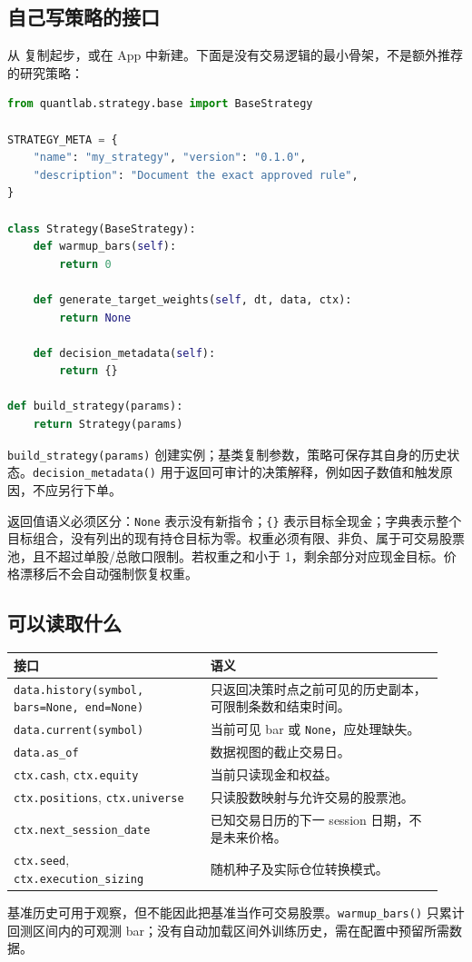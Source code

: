 \documentclass[UTF8,fontset=none,11pt]{ctexart}
\newcommand{\code}[1]{\nolinkurl{#1}}
\let\originalsubsection\subsection
\renewcommand{\subsection}{\Needspace{8\baselineskip}\originalsubsection}
\begin{document}
\subsection{自己写策略的接口}
从  复制起步，或在 App 中新建。下面是没有交易逻辑的最小骨架，不是额外推荐的研究策略：
\begin{lstlisting}[language=Python]
from quantlab.strategy.base import BaseStrategy

STRATEGY_META = {
    "name": "my_strategy", "version": "0.1.0",
    "description": "Document the exact approved rule",
}

class Strategy(BaseStrategy):
    def warmup_bars(self):
        return 0

    def generate_target_weights(self, dt, data, ctx):
        return None

    def decision_metadata(self):
        return {}

def build_strategy(params):
    return Strategy(params)
\end{lstlisting}
\code{build_strategy(params)} 创建实例；基类复制参数，策略可保存其自身的历史状态。\code{decision_metadata()} 用于返回可审计的决策解释，例如因子数值和触发原因，不应另行下单。

返回值语义必须区分：\code{None} 表示没有新指令；\texttt{\{\}} 表示目标全现金；字典表示整个目标组合，没有列出的现有持仓目标为零。权重必须有限、非负、属于可交易股票池，且不超过单股/总敞口限制。若权重之和小于 1，剩余部分对应现金目标。价格漂移后不会自动强制恢复权重。

\subsection{可以读取什么}
\begin{longtable}{p{0.43\linewidth}p{0.51\linewidth}}
\toprule 接口 & 语义\\\midrule\endhead
\code{data.history(symbol, bars=None, end=None)} & 只返回决策时点之前可见的历史副本，可限制条数和结束时间。\\
\code{data.current(symbol)} & 当前可见 bar 或 \code{None}，应处理缺失。\\
\code{data.as_of} & 数据视图的截止交易日。\\
\code{ctx.cash}, \code{ctx.equity} & 当前只读现金和权益。\\
\code{ctx.positions}, \code{ctx.universe} & 只读股数映射与允许交易的股票池。\\
\code{ctx.next_session_date} & 已知交易日历的下一 session 日期，不是未来价格。\\
\code{ctx.seed}, \code{ctx.execution_sizing} & 随机种子及实际仓位转换模式。\\
\bottomrule
\end{longtable}
基准历史可用于观察，但不能因此把基准当作可交易股票。\code{warmup_bars()} 只累计回测区间内的可观测 bar；没有自动加载区间外训练历史，需在配置中预留所需数据。
\end{document}
